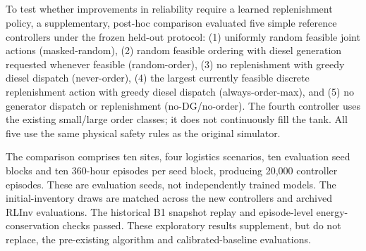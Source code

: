\subsection[Supplementary Null-Controller Diagnostic]
{}
\label{sec:null_controller_diagnostic}

\begin{revisedblock}
To test whether improvements in reliability require a learned
replenishment policy, a supplementary, post-hoc comparison evaluated
five simple reference controllers under the frozen held-out protocol:
(1) uniformly random feasible joint actions (masked-random),
(2) random feasible ordering with diesel generation requested whenever
feasible (random-order), (3) no replenishment with greedy diesel
dispatch (never-order), (4) the largest currently feasible discrete
replenishment action with greedy diesel dispatch (always-order-max), and
(5) no generator dispatch or replenishment (no-DG/no-order).
The fourth controller uses the existing small/large order classes;
it does not continuously fill the tank. All five use the same physical
safety rules as the original simulator.

The comparison comprises ten sites, four logistics scenarios, ten
evaluation seed blocks and ten 360-hour episodes per seed block,
producing 20,000 controller episodes. These are evaluation seeds,
not independently trained models. The initial-inventory draws are
matched across the new controllers and archived RLInv evaluations.
The historical B1 snapshot replay and episode-level energy-conservation
checks passed. These exploratory results supplement, but do not
replace, the pre-existing algorithm and calibrated-baseline evaluations.
\end{revisedblock}

